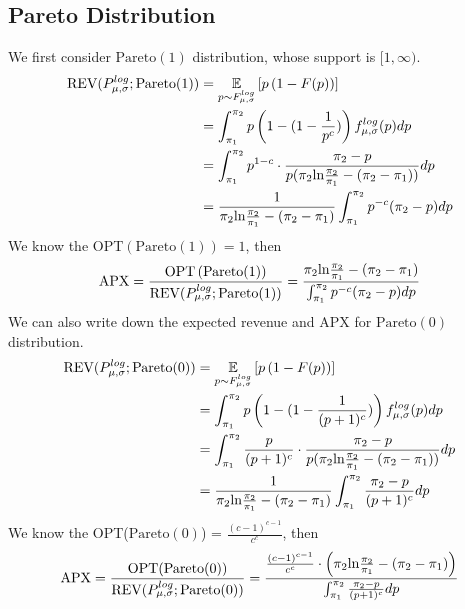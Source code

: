 \subsection{Pareto Distribution}
We first consider $\text{Pareto}(1)$ distribution, whose support is $[1, \infty)$. 
\begin{equation}\notag
\begin{split}	
	\text{REV}(P^{log}_{\mu,\sigma} ;\text{Pareto}(1)) &=\underset{p \sim F^{log}_{\mu,\sigma} }{\mathbb{E}}\left[ p\left(1-F(p)\right)\right] \\ &= \int_{\pi_1}^{\pi_2} p\left(1 -  (1-\frac{1}{p^c})\right)f^{log}_{\mu,\sigma}(p)dp \\&=\int_{\pi_1}^{\pi_2} p^{1-c}\cdot \frac{\pi_2 -p}{p(\pi_2 \text{ln}\frac{\pi_2}{\pi_1} - (\pi_2-\pi_1))} dp \\&=  \frac{1}{\pi_2 \text{ln}\frac{\pi_2}{\pi_1} - (\pi_2-\pi_1)}\int_{\pi_1}^{\pi_2} p^{-c}(\pi_2-p)dp 
\end{split}
\end{equation} 
We know the OPT$\left(\text{Pareto}(1)\right) = 1$, then
\begin{equation}\notag
    \text{APX} = \frac{\text{OPT}\left(\text{Pareto}(1)\right)}{\text{REV}(P^{log}_{\mu,\sigma} ;\text{Pareto}
    (1))} = \frac{\pi_2 \text{ln}\frac{\pi_2}{\pi_1} - (\pi_2-\pi_1)}{ \int_{\pi_1}^{\pi_2} p^{-c}(\pi_2-p)dp }
\end{equation}
We can also write down the expected revenue and APX for $\text{Pareto}(0)$ distribution.
\begin{equation}\notag
\begin{split}	
	\text{REV}(P^{log}_{\mu,\sigma} ;\text{Pareto}(0)) &=\underset{p \sim F^{log}_{\mu,\sigma} }{\mathbb{E}}\left[ p\left(1-F(p)\right)\right] \\ &= \int_{\pi_1}^{\pi_2} p\left(1 -  (1-\frac{1}{(p+1)^c})\right)f^{log}_{\mu,\sigma}(p)dp \\&=\int_{\pi_1}^{\pi_2} \frac{p}{(p+1)^c}\cdot \frac{\pi_2 -p}{p(\pi_2 \text{ln}\frac{\pi_2}{\pi_1} - (\pi_2-\pi_1))} dp \\&=  \frac{1}{\pi_2 \text{ln}\frac{\pi_2}{\pi_1} - (\pi_2-\pi_1)}\int_{\pi_1}^{\pi_2} \frac{\pi_2 - p}{(p+1)^c}dp 
\end{split}
\end{equation} 
We know the OPT($\text{Pareto}(0)$) = $\frac{(c-1)^{c-1}}{c^c}$, then
\begin{equation}\notag
    \text{APX} = \frac{\text{OPT}(\text{Pareto}(0))}{\text{REV}(P^{log}_{\mu,\sigma} ;\text{Pareto}(0))} = \frac{\frac{(c-1)^{c-1}}{c^c}\cdot \left(\pi_2 \text{ln}\frac{\pi_2}{\pi_1} - (\pi_2-\pi_1)\right)}{ \int_{\pi_1}^{\pi_2} \frac{\pi_2 - p}{(p+1)^c}dp  }
\end{equation}

